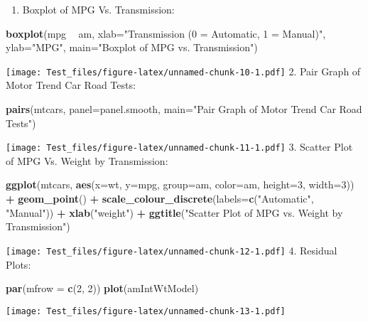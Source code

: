 \documentclass[]{article}
\newenvironment{Shaded}{\begin{snugshade}}{\end{snugshade}}
\newcommand{\KeywordTok}[1]{\textcolor[rgb]{0.13,0.29,0.53}{\textbf{#1}}}
\newcommand{\DataTypeTok}[1]{\textcolor[rgb]{0.13,0.29,0.53}{#1}}
\newcommand{\DecValTok}[1]{\textcolor[rgb]{0.00,0.00,0.81}{#1}}
\newcommand{\StringTok}[1]{\textcolor[rgb]{0.31,0.60,0.02}{#1}}
\newcommand{\OperatorTok}[1]{\textcolor[rgb]{0.81,0.36,0.00}{\textbf{#1}}}
\newcommand{\NormalTok}[1]{#1}
\providecommand{\tightlist}{%
  \setlength{\itemsep}{0pt}\setlength{\parskip}{0pt}}
\begin{document}
\begin{enumerate}
\def\labelenumi{\arabic{enumi}.}
\tightlist
\item
  Boxplot of MPG Vs. Transmission:
\end{enumerate}

\begin{Shaded}
\begin{Highlighting}[]
\KeywordTok{boxplot}\NormalTok{(mpg }\OperatorTok{~}\StringTok{ }\NormalTok{am, }\DataTypeTok{xlab=}\StringTok{"Transmission (0 = Automatic, 1 = Manual)"}\NormalTok{, }\DataTypeTok{ylab=}\StringTok{"MPG"}\NormalTok{,}
        \DataTypeTok{main=}\StringTok{"Boxplot of MPG vs. Transmission"}\NormalTok{)}
\end{Highlighting}
\end{Shaded}

\texttt{[image: Test\_files/figure-latex/unnamed-chunk-10-1.pdf]} 2. Pair
Graph of Motor Trend Car Road Tests:

\begin{Shaded}
\begin{Highlighting}[]
\KeywordTok{pairs}\NormalTok{(mtcars, }\DataTypeTok{panel=}\NormalTok{panel.smooth, }\DataTypeTok{main=}\StringTok{"Pair Graph of Motor Trend Car Road Tests"}\NormalTok{)}
\end{Highlighting}
\end{Shaded}

\texttt{[image: Test\_files/figure-latex/unnamed-chunk-11-1.pdf]} 3.
Scatter Plot of MPG Vs. Weight by Transmission:

\begin{Shaded}
\begin{Highlighting}[]
\KeywordTok{ggplot}\NormalTok{(mtcars, }\KeywordTok{aes}\NormalTok{(}\DataTypeTok{x=}\NormalTok{wt, }\DataTypeTok{y=}\NormalTok{mpg, }\DataTypeTok{group=}\NormalTok{am, }\DataTypeTok{color=}\NormalTok{am, }\DataTypeTok{height=}\DecValTok{3}\NormalTok{, }\DataTypeTok{width=}\DecValTok{3}\NormalTok{)) }\OperatorTok{+}\StringTok{ }\KeywordTok{geom_point}\NormalTok{() }\OperatorTok{+}\StringTok{  }
\KeywordTok{scale_colour_discrete}\NormalTok{(}\DataTypeTok{labels=}\KeywordTok{c}\NormalTok{(}\StringTok{"Automatic"}\NormalTok{, }\StringTok{"Manual"}\NormalTok{)) }\OperatorTok{+}\StringTok{ }
\KeywordTok{xlab}\NormalTok{(}\StringTok{"weight"}\NormalTok{) }\OperatorTok{+}\StringTok{ }\KeywordTok{ggtitle}\NormalTok{(}\StringTok{"Scatter Plot of MPG vs. Weight by Transmission"}\NormalTok{)}
\end{Highlighting}
\end{Shaded}

\texttt{[image: Test\_files/figure-latex/unnamed-chunk-12-1.pdf]} 4.
Residual Plots:

\begin{Shaded}
\begin{Highlighting}[]
\KeywordTok{par}\NormalTok{(}\DataTypeTok{mfrow =} \KeywordTok{c}\NormalTok{(}\DecValTok{2}\NormalTok{, }\DecValTok{2}\NormalTok{))}
\KeywordTok{plot}\NormalTok{(amIntWtModel)}
\end{Highlighting}
\end{Shaded}

\texttt{[image: Test\_files/figure-latex/unnamed-chunk-13-1.pdf]}
\end{document}
